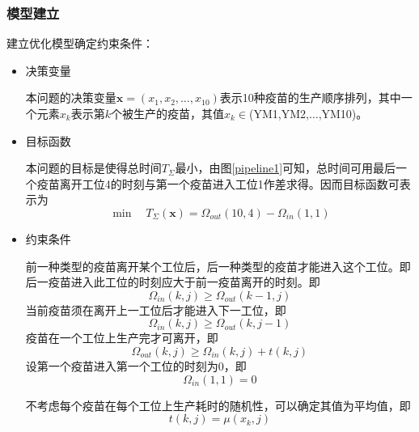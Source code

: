 \documentclass[UTF8]{ctexart}
\begin{document}
	\subsubsection{模型建立}
%		
	
	建立优化模型确定约束条件：
	\begin{itemize}
		\item 决策变量 
		\par 本问题的决策变量$\boldsymbol{x}=(x_{1},x_{2},\dots,x_{10})$表示10种疫苗的生产顺序排列，其中一个元素$x_{k}$表示第$k$个被生产的疫苗，其值$x_{k}\in$(YM1,YM2,$\dots$,YM10)。
		\item 目标函数
		\par 本问题的目标是使得总时间$T_{\Sigma}$最小，由图\ref{pipeline1}可知，总时间可用最后一个疫苗离开工位4的时刻与第一个疫苗进入工位1作差求得。因而目标函数可表示为
		\begin{equation}
			\min \quad T_{\Sigma}(\boldsymbol{x})=\Omega_{out}(10,4)-\Omega_{in}(1,1)
		\end{equation}
		\item 约束条件
		\par 前一种类型的疫苗离开某个工位后，后一种类型的疫苗才能进入这个工位。即后一疫苗进入此工位的时刻应大于前一疫苗离开的时刻。即
	\begin{equation}
		\Omega_{in}(k,j)\geqslant\Omega_{out}(k-1,j)
	\end{equation}
	当前疫苗须在离开上一工位后才能进入下一工位，即
	\begin{equation}
		\Omega_{in}(k,j)\geqslant\Omega_{out}(k,j-1)
	\end{equation}
	疫苗在一个工位上生产完才可离开，即
	\begin{equation}
		\Omega_{out}(k,j)\geqslant\Omega_{in}(k,j)+t(k,j)
	\end{equation}
	设第一个疫苗进入第一个工位的时刻为0，即
	\begin{equation}
		\Omega_{in}(1,1)=0
		\label{eq0}
	\end{equation}

	不考虑每个疫苗在每个工位上生产耗时的随机性，可以确定其值为平均值，即
	\begin{equation}
		t(k,j)=\mu(x_{k},j)
		\label{eq1}
	\end{equation}
		



\end{itemize}
\end{document}
